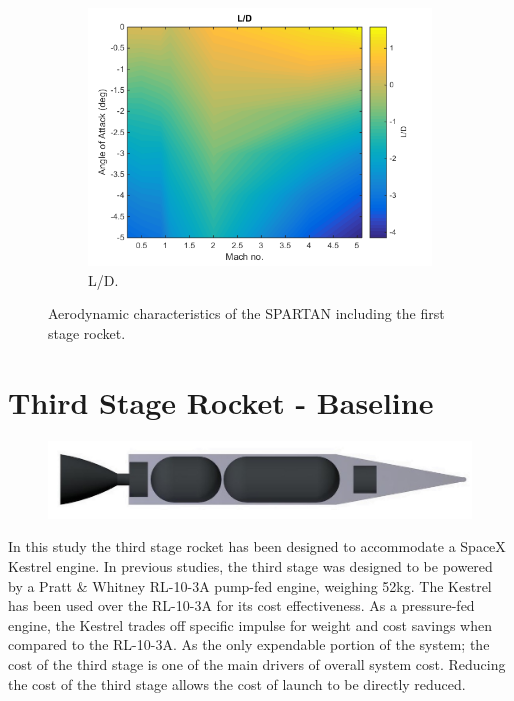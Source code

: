 \begin{figure}
\begin{subfigure}{.5\textwidth}
		\includegraphics[width=0.99\linewidth]{figures/3_vehicle_design/FirstStageLD}
		\caption{L/D.}
		\label{fig:LD-EFirstStage}
	\end{subfigure}
	\caption{Aerodynamic characteristics of the SPARTAN including the first stage rocket.}
	\label{fig:FirstStageAero}
\end{figure}


	

	\section{Third Stage Rocket - Baseline}
	
	\begin{figure}
\centering
\includegraphics[width=0.7\linewidth]{figures/3_vehicle_design/3rdStage}
\caption{}
\label{fig:3rdStage}
\end{figure}
	
	In this study the third stage rocket has been designed to accommodate a SpaceX Kestrel engine. In previous studies, the third stage was designed to be powered by a Pratt \& Whitney RL-10-3A pump-fed engine, weighing 52kg. The Kestrel has been used over the RL-10-3A for its cost effectiveness. As a pressure-fed engine, the Kestrel trades off specific impulse for weight and cost savings when compared to the RL-10-3A. As the only expendable portion of the system; the cost of the third stage is one of the main drivers of overall system cost. Reducing the cost of the third stage allows the cost of launch to be directly reduced. 
	
